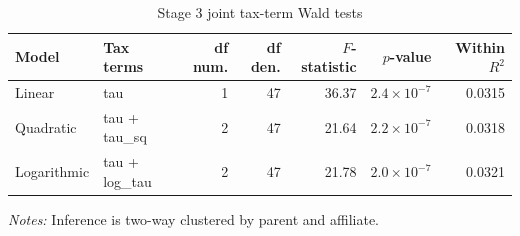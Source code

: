 \begin{table}[H]
\centering
\footnotesize
\setlength{\tabcolsep}{3pt}
\caption{Stage 3 joint tax-term Wald tests}
\label{tab:app_stage3_wald_tests}
\begin{tabular}{@{}llrrrrr@{}}
\toprule
Model & Tax terms & df num. & df den. & $F$-statistic & $p$-value & Within $R^2$ \\
\midrule
Linear & tau & 1 & 47 & 36.37 & $2.4 \times 10^{-7}$ & 0.0315 \\
Quadratic & tau + tau\_sq & 2 & 47 & 21.64 & $2.2 \times 10^{-7}$ & 0.0318 \\
Logarithmic & tau + log\_tau & 2 & 47 & 21.78 & $2.0 \times 10^{-7}$ & 0.0321 \\
\bottomrule
\end{tabular}

\vspace{0.35em}
\noindent\begin{minipage}{\textwidth}
\footnotesize\raggedright\textit{Notes:} Inference is two-way clustered by parent and affiliate.
\end{minipage}
\end{table}

